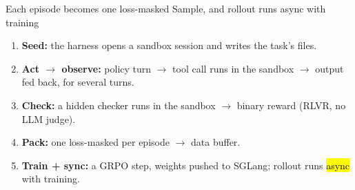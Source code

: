 \begin{frame}{Each episode becomes one loss-masked Sample, and rollout runs async with training}
\centering
{}
\par\vspace{3mm}
\raggedright
\begin{enumerate}\footnotesize\setlength{\itemsep}{0.6mm}
\item \textbf{Seed:} the harness opens a sandbox session and writes the task's files.
\item \textbf{Act $\rightarrow$ observe:} policy turn $\rightarrow$ tool call runs in the sandbox $\rightarrow$ output fed back, for several turns.
\item \textbf{Check:} a hidden checker runs in the sandbox $\rightarrow$ binary reward (RLVR, no LLM judge).
\item \textbf{Pack:} one loss-masked  per episode $\rightarrow$ data buffer.
\item \textbf{Train + sync:} a GRPO step, weights pushed to SGLang; rollout runs \hl{async} with training.
\end{enumerate}
\end{frame}


